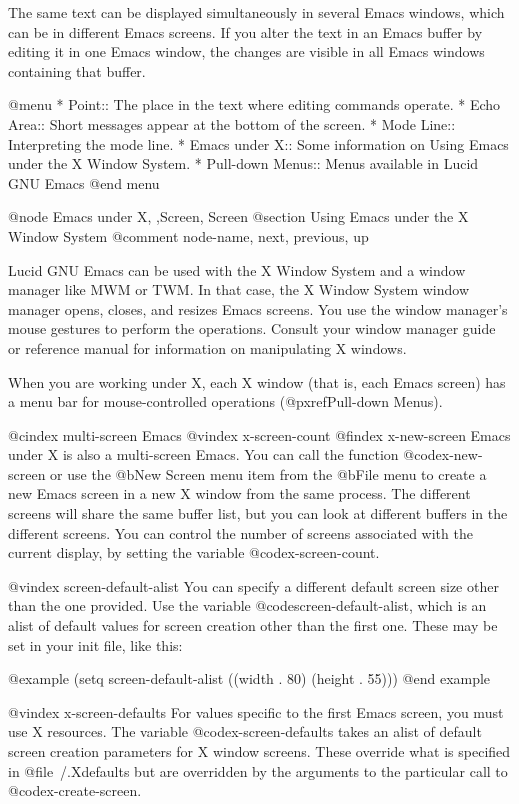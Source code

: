   The same text can be displayed simultaneously in several Emacs
windows, which can be in different Emacs screens.  If you alter the text
in an Emacs buffer by editing it in one Emacs window, the changes are
visible in all Emacs windows containing that buffer.


@menu
* Point::	        The place in the text where editing commands operate.  
* Echo Area::           Short messages appear at the bottom of the screen.  
* Mode Line::	        Interpreting the mode line.  
* Emacs under X::       Some information on Using Emacs under the X 
                        Window System. 
* Pull-down Menus::     Menus available in Lucid GNU Emacs
@end menu


@node Emacs under X, ,Screen, Screen
@section Using Emacs under the X Window System
@comment  node-name,  next,  previous,  up


 Lucid GNU Emacs can be used with the X Window System and a window
manager like MWM or TWM.  In that case, the X Window System window
manager opens, closes, and resizes Emacs screens.  You use the window
manager's mouse gestures to perform the operations.  Consult your window
manager guide or reference manual for information on manipulating X
windows.

When you are working under X, each X window (that is, each Emacs screen)
has a menu bar for mouse-controlled operations (@pxref{Pull-down Menus}).

@cindex multi-screen Emacs
@vindex x-screen-count
@findex x-new-screen
Emacs under X is also a multi-screen Emacs.  You can call the function
@code{x-new-screen} or use the @b{New Screen} menu item from the
@b{File} menu to create a new Emacs screen in a new X window from the
same process.  The different screens will share the same buffer list,
but you can look at different buffers in the different screens. You can
control the number of screens associated with the current display, by
setting the variable @code{x-screen-count}.

@vindex screen-default-alist
You can specify a different default screen size other than the one
provided. Use the variable @code{screen-default-alist}, which is an
alist of default values for screen creation other than the first one.
These may be set in your init file, like this:

@example
  (setq screen-default-alist ((width . 80) (height . 55)))
@end example

@vindex x-screen-defaults
For values specific to the first Emacs screen, you must use X resources.
The variable @code{x-screen-defaults} takes an alist of default screen
creation parameters for X window screens.  These override what is
specified in @file{~/.Xdefaults} but are overridden by the arguments to
the particular call to @code{x-create-screen}.

